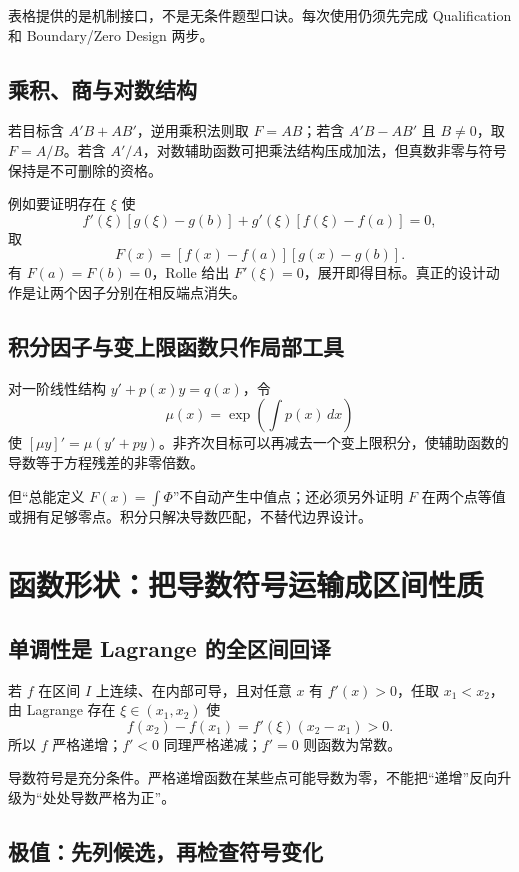 \documentclass[UTF8,fontset=none,11pt,a4paper]{ctexart}
\begin{document}
表格提供的是机制接口，不是无条件题型口诀。每次使用仍须先完成 Qualification 和 Boundary\allowbreak/Zero Design 两步。

\subsection{乘积、商与对数结构}

若目标含 $A'B+AB'$，逆用乘积法则取 $F=AB$；若含 $A'B-AB'$ 且 $B\ne0$，取 $F=A/B$。若含 $A'/A$，对数辅助函数可把乘法结构压成加法，但真数非零与符号保持是不可删除的资格。

例如要证明存在 $\xi$ 使
\[
f'(\xi)[g(\xi)-g(b)]+g'(\xi)[f(\xi)-f(a)]=0,
\]
取
\[
F(x)=[f(x)-f(a)][g(x)-g(b)].
\]
有 $F(a)=F(b)=0$，Rolle 给出 $F'(\xi)=0$，展开即得目标。真正的设计动作是让两个因子分别在相反端点消失。

\subsection{积分因子与变上限函数只作局部工具}

对一阶线性结构 $y'+p(x)y=q(x)$，令
\[
\mu(x)=\exp\left(\int p(x)\,dx\right)
\]
使 $[\mu y]'=\mu(y'+py)$。非齐次目标可以再减去一个变上限积分，使辅助函数的导数等于方程残差的非零倍数。

但“总能定义 $F(x)=\int\Phi$”不自动产生中值点；还必须另外证明 $F$ 在两个点等值或拥有足够零点。积分只解决导数匹配，不替代边界设计。

\section{函数形状：把导数符号运输成区间性质}

\subsection{单调性是 Lagrange 的全区间回译}

若 $f$ 在区间 $I$ 上连续、在内部可导，且对任意 $x$ 有 $f'(x)>0$，任取 $x_1<x_2$，由 Lagrange 存在 $\xi\in(x_1,x_2)$ 使
\[
f(x_2)-f(x_1)=f'(\xi)(x_2-x_1)>0.
\]
所以 $f$ 严格递增；$f'<0$ 同理严格递减；$f'=0$ 则函数为常数。

导数符号是充分条件。严格递增函数在某些点可能导数为零，不能把“递增”反向升级为“处处导数严格为正”。

\subsection{极值：先列候选，再检查符号变化}
\end{document}
